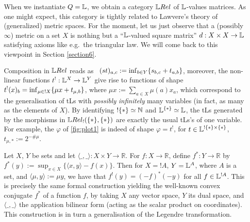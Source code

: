 
When we instantiate $Q=\mathbb{L}$, we obtain a category $\LREL$ of $\mathbb{L}$-values matrices. As one might expect, this category is tightly related to Lawvere's theory of (generalized) metric spaces. For the moment, let us just observe that a (possibly $\infty$) metric on a set $X$ is nothing but a ``$\mathbb{L}$-valued square matrix'' $d:X\times X\to \mathbb{L}$ satisfying axioms like e.g.~the triangular law.
We will come back to this viewpoint in Section \ref{section6}.

Composition in $\LREL$ %
reads as \ $(st)_{a,c}:=\inf_{b\in Y}\{s_{b,c}+t_{a,b}\}$, moreover, the non-linear functions $t^{!}: \mathbb{L}^{X}\to \mathbb{L}^{Y}$ give rise to functions of shape 
$t^!(x)_b=\inf_{\mu\in !X} \{\mu x+ t_{\mu,b}\}$, where $\mu x:=\sum_{a\in X} \mu(a)x_a$, which correspond to the generalisation of tLs with \emph{possibly infinitely} many variables (in fact, as many as the elements of $X$).
By identifying $!\{*\}\simeq \mathbb{N}$ and $\mathbb{L}^{\{*\}}\simeq\mathbb{L}$, the tLs generated by the morphisms in $\HOM{\LREL_!}{\set{*}}{\set{*}}$ are exactly the %
usual tLs's of one variable. %
For example, the $\varphi$ of \autoref{fig:plot1} is indeed of shape $\varphi=t^!$, for $t\in\mathbb{L}^{!\{*\}\times\{*\}}$, $t_{\mu,*}:=2^{-\# \mu}$.

\begin{remark}
 Let $X$, $Y$ be sets and let $\langle \_,\_\rangle:X\times Y \to \mathbb{R}$.
 For $f:X\to \mathbb R$, define $f^*:Y\to \mathbb R$ by $f^*(y):= \sup_{x\in X}\{\langle x,y\rangle - f(x)\}$.
 Then for $X=!A$, $Y=\mathbb{L}^A$, where $A$ is a set, and $\langle \mu, y \rangle:= \mu y$, we have that $f^!(y)=(-f)^*(-y)$ for all $f\in\mathbb{L}^{!A}$.
 This is precisely the same formal construction yielding the well-known convex conjugate $f^*$ of a function $f$, by taking $X$ any vector space, $Y$ its dual space, and $\langle \_,\_\rangle$ the application bilinear form (acting as the scalar product on coordinates).
 This construction is in turn a generalisation of the Legendre transformation.
\end{remark}


